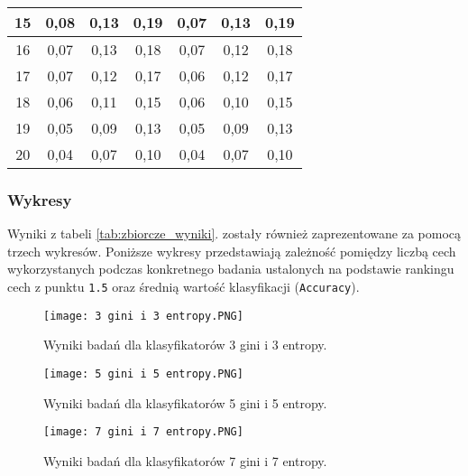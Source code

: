 \documentclass{article}
\begin{document}
\begin{center}
\begin{longtable}{c|c|c|c|c|c|c|}
\multicolumn{1}{|c|}{15}          & 0,08   & 0,13   & 0,19   & 0,07      & 0,13      & 0,19      \\ \hline
\multicolumn{1}{|c|}{16}          & 0,07   & 0,13   & 0,18   & 0,07      & 0,12      & 0,18      \\ \hline
\multicolumn{1}{|c|}{17}          & 0,07   & 0,12   & 0,17   & 0,06      & 0,12      & 0,17      \\ \hline
\multicolumn{1}{|c|}{18}          & 0,06   & 0,11   & 0,15   & 0,06      & 0,10      & 0,15      \\ \hline
\multicolumn{1}{|c|}{19}          & 0,05   & 0,09   & 0,13   & 0,05      & 0,09      & 0,13      \\ \hline
\multicolumn{1}{|c|}{20}          & 0,04   & 0,07   & 0,10   & 0,04      & 0,07      & 0,10      \\ \hline
        
\end{longtable}
\end{center}
\newpage
\subsubsection{Wykresy}
\quad Wyniki z tabeli \ref{tab:zbiorcze_wyniki}. zostały również zaprezentowane za pomocą trzech wykresów. Poniższe wykresy przedstawiają zależność pomiędzy liczbą cech wykorzystanych podczas konkretnego badania ustalonych na podstawie rankingu cech z punktu \texttt{1.5} oraz średnią wartość klasyfikacji (\texttt{Accuracy}).\\  


\begin{figure}[ht]
    \centering
    \noindent 
    \vspace{.2cm}
    \texttt{[image: 3 gini i 3 entropy.PNG]}
    \caption{Wyniki badań dla klasyfikatorów 3 gini i 3 entropy.}
    \label{fig:3gini_i_3entropy}
\end{figure}

\newpage

\begin{figure}[ht]
    \centering
    \noindent 
    \vspace{.2cm}
    \texttt{[image: 5 gini i 5 entropy.PNG]}
    \caption{Wyniki badań dla klasyfikatorów 5 gini i 5 entropy.}
    \label{fig:5gini_i_5entropy}
\end{figure}

\newpage

\begin{figure}[ht]
    \centering
    \noindent 
    \vspace{.2cm}
    \texttt{[image: 7 gini i 7 entropy.PNG]}
    \caption{Wyniki badań dla klasyfikatorów 7 gini i 7 entropy.}
    \label{fig:7gini_i_7entropy}
\end{figure}
\end{document}
